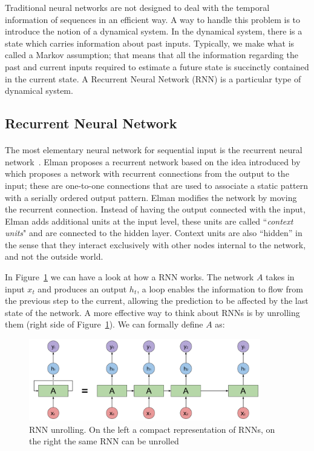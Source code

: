 Traditional neural networks are not designed to deal with the temporal information of sequences in an efficient way. A way to handle this problem is to introduce the notion of a dynamical system. In the dynamical system, there is a state which carries information about past inputs. Typically, we make what is called a Markov assumption; that means that all the information regarding the past and current inputs required to estimate a future state is succinctly contained in the current state. A Recurrent Neural Network (RNN) is a particular type of dynamical system.

\subsection{Recurrent Neural Network}
\paragraph{}
The most elementary neural network for sequential input is the recurrent neural network~\citep{elman1990finding}. Elman proposes a recurrent network based on the idea introduced by~\citet{jordan1986} which proposes a network with recurrent connections from the output to the input; these are one-to-one connections that are used to associate a static pattern with a serially ordered output pattern. Elman modifies the network by moving the recurrent connection. Instead of having the output connected with the input, Elman adds additional units at the input level, these units are called ``\textit{context units}" and are connected to the hidden layer. Context units are also “hidden” in the sense that they interact exclusively with other nodes internal to the network, and not the outside world. 

In Figure~\ref{fig:rnn} we can have a look at how a RNN works. The network $A$ takes in input $x_t$ and produces an output $h_t$, a loop enables the information to flow from the previous step to the current, allowing the prediction to be affected by the last state of the network. A more effective way to think about RNNs is by unrolling them (right side of Figure~\ref{fig:rnn}). We can formally define $A$ as:

\begin{figure}[t]
        \centering
        \includegraphics[width=0.9\textwidth]{images/RNN.pdf}
        \caption{RNN unrolling. On the left a compact representation of RNNs, on the right the same RNN can be unrolled}
        \label{fig:rnn}
\end{figure}%

